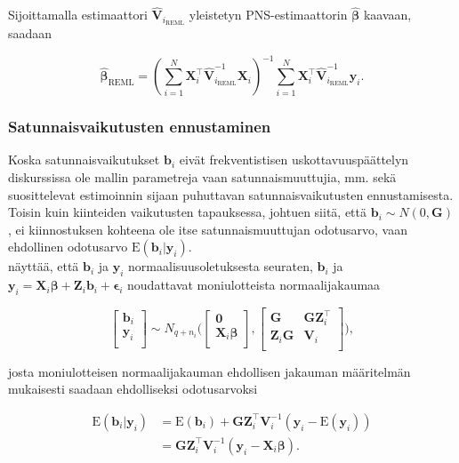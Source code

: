 \documentclass[finnish]{docopts}
\begin{document}
Sijoittamalla estimaattori $\hat{\bm{V}}_{i_{\text{REML}}}$ yleistetyn PNS-estimaattorin $\hat{\bm{\beta}}$ kaavaan, saadaan

$$
\hat{\bm{\beta}}_{\text{REML}} =  (\sum\limits_{i=1}^{N} \bm{X}_{i}^\top \hat{\bm{V}}_{i_{\text{REML}}}^{-1} \bm{X}_{i})^{-1} \sum\limits_{i=1}^{N} \bm{X}_{i}^\top \hat{\bm{V}}_{i_{\text{REML}}}^{-1} \bm{y}_i.
$$

\subsubsection{Satunnaisvaikutusten ennustaminen}
\label{sub:satunnaisvaik}

Koska satunnaisvaikutukset $\bm{b}_i$ eivät frekventistisen uskottavuuspäättelyn diskurssissa ole mallin parametreja vaan satunnaismuuttujia, mm. \cite{west14} sekä \cite{pinheiro00} suosittelevat estimoinnin sijaan puhuttavan satunnaisvaikutusten ennustamisesta. \\

Toisin kuin kiinteiden vaikutusten tapauksessa, johtuen siitä, että $\bm{b}_i \sim N(0, \bm{G})$, ei kiinnostuksen kohteena ole itse satunnaismuuttujan odotusarvo, vaan ehdollinen odotusarvo $\text{E}(\bm{b}_i | \bm{y}_i)$. \\

\cite{nissinen09} näyttää, että $\bm{b}_i$ ja $\bm{y}_i$ normaalisuusoletuksesta seuraten, $\bm{b}_i$ ja $\bm{y}_i = \bm{X}_i \bm{\beta} + \bm{Z}_i \bm{b}_i + \bm{\epsilon}_i$ noudattavat moniulotteista normaalijakaumaa

$$
\begin{bmatrix}
\bm{b}_i \\
\bm{y}_i \\
\end{bmatrix}
\sim N_{q+n_i} \bigg(
\begin{bmatrix}
\bm{0} \\
\bm{X}_i \bm{\beta} \\
\end{bmatrix},
\begin{bmatrix}
\bm{G} & \bm{G} \bm{Z}_{i}^\top \\
\bm{Z}_i \bm{G} & \bm{V}_i \\
\end{bmatrix}
\bigg),
$$

josta moniulotteisen normaalijakauman ehdollisen jakauman määritelmän mukaisesti saadaan ehdolliseksi odotusarvoksi

$$
\begin{aligned}
\text{E}(\bm{b}_i | \bm{y}_i) &= \text{E}(\bm{b}_i) + \bm{G} \bm{Z}_{i}^\top \bm{V}_{i}^{-1}(\bm{y}_i - \text{E}(\bm{y}_i)) \\
&= \bm{G} \bm{Z}_{i}^\top \bm{V}_{i}^{-1}(\bm{y}_i - \bm{X}_i \bm{\beta}). \\
\end{aligned}
$$
\end{document}
